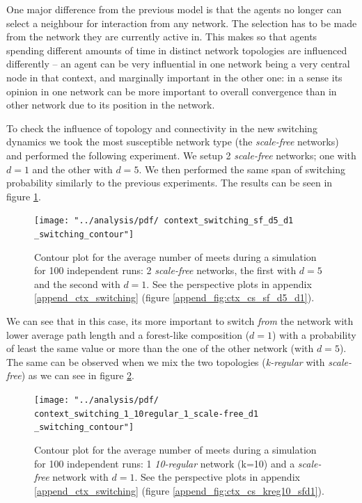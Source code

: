 \documentclass[preprint,number]{elsarticle}
\begin{document}
One major difference from the previous model is that the agents no longer can select a neighbour for interaction from any network. The selection has to be made from the network they are currently active in. This makes so that agents spending different amounts of time in distinct network topologies are influenced differently -- an agent can be very influential in one network being a very central node in that context, and marginally important in the other one: in a sense its opinion in one network can be more important to overall convergence than in other network due to its position in the network.

To check the influence of topology and connectivity in the new switching dynamics we took the most susceptible network type (the \textit{scale-free} networks) and performed the following experiment. We setup 2 \textit{scale-free} networks; one with $d=1$ and the other with $d=5$. We then performed the 
same span of switching probability similarly to the previous experiments. The results can be seen in figure \ref{fig:ctx_cs_sf_d5_d1}.

\begin{figure}[H]
	\centering
	\texttt{[image: "../analysis/pdf/ context\_switching\_sf\_d5\_d1 \_switching\_contour"]}
	\begin{minipage}{0.9\textwidth}
		\caption{Contour plot for the average number of meets during a simulation for 100 independent runs: 2 \textit{scale-free} networks, the first with $d=5$ and the second with $d=1$. See the perspective plots in  appendix \ref{append_ctx_switching} (figure \ref{append_fig:ctx_cs_sf_d5_d1}).
		}
		\label{fig:ctx_cs_sf_d5_d1}
	\end{minipage}
\end{figure}

We can see that in this case, its more important to switch \textit{from} the network with lower average path length and a forest-like composition ($d=1$) with a probability of least the same value or more than the one of the other network (with $d=5$). The same can be observed when we mix the two topologies (\textit{k-regular} with \textit{scale-free}) as we can see in figure \ref{fig:ctx_cs_kreg10_sfd1}.

\begin{figure}[H]
	\centering
	\texttt{[image: "../analysis/pdf/ context\_switching\_1\_10regular\_1\_scale-free\_d1 \_switching\_contour"]}
	\begin{minipage}{0.9\textwidth}
		\caption{Contour plot for the average number of meets during a simulation for 100 independent runs: 1 \textit{10-regular} network (k=10) and a \textit{scale-free} network with $d=1$. See the perspective plots in  appendix \ref{append_ctx_switching} (figure \ref{append_fig:ctx_cs_kreg10_sfd1}).
		}
		\label{fig:ctx_cs_kreg10_sfd1}
	\end{minipage}
\end{figure}
\end{document}
